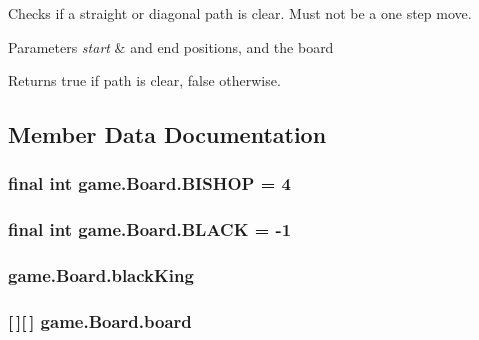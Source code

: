 Checks if a straight or diagonal path is clear. Must not be a one step move. 
\begin{DoxyParams}{Parameters}
{\em start} & and end positions, and the board \\
\hline
\end{DoxyParams}
\begin{DoxyReturn}{Returns}
true if path is clear, false otherwise. 
\end{DoxyReturn}


\subsection{Member Data Documentation}
\hypertarget{classgame_1_1_board_a43354b0544e528583e783c228b3016a3}{
\subsubsection[{B\-I\-S\-H\-O\-P}]{\setlength{\rightskip}{0pt plus 5cm}final int game.\-Board.\-B\-I\-S\-H\-O\-P = 4\hspace{0.3cm}{\ttfamily [static]}}}\label{classgame_1_1_board_a43354b0544e528583e783c228b3016a3}
\hypertarget{classgame_1_1_board_a6495a2020e20b656f5e82cf55cae41f0}{
\subsubsection[{B\-L\-A\-C\-K}]{\setlength{\rightskip}{0pt plus 5cm}final int game.\-Board.\-B\-L\-A\-C\-K = -\/1\hspace{0.3cm}{\ttfamily [static]}}}\label{classgame_1_1_board_a6495a2020e20b656f5e82cf55cae41f0}
\hypertarget{classgame_1_1_board_a3208a9b2a809f279c2f33f2f87a9a68c}{
\subsubsection[{black\-King}]{ game.\-Board.\-black\-King}}\label{classgame_1_1_board_a3208a9b2a809f279c2f33f2f87a9a68c}
\hypertarget{classgame_1_1_board_a7b235a9a7c1dbfd5373366fe8bd2c4e2}{
\subsubsection[{board}]{ \mbox{[}$\,$\mbox{]}\mbox{[}$\,$\mbox{]} game.\-Board.\-board}}\label{classgame_1_1_board_a7b235a9a7c1dbfd5373366fe8bd2c4e2}
